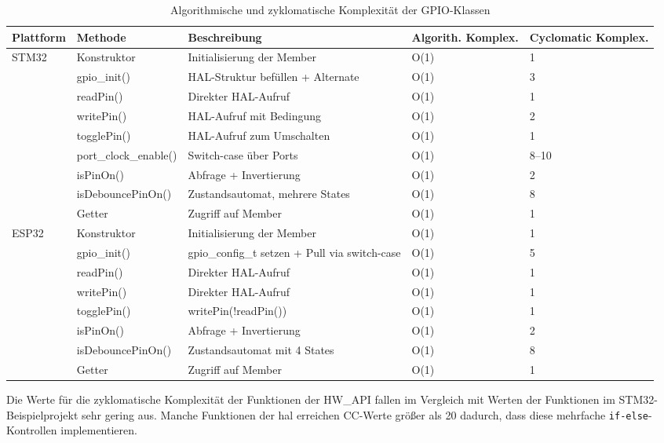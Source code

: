 \begin{table}[H]
\centering
	\begin{tabular}{@{}llp{4cm}p{2cm}p{2cm}@{}}
	\toprule
\textbf{Plattform} & \textbf{Methode} & \textbf{Beschreibung} & \textbf{Algorith. Komplex.} & \textbf{Cyclomatic Komplex.} \\ \midrule
STM32 & Konstruktor & Initialisierung der Member & O(1) & 1 \\
      & gpio\_init() & HAL-Struktur befüllen + Alternate & O(1) & 3 \\
      & readPin() & Direkter HAL-Aufruf & O(1) & 1 \\
      & writePin() & HAL-Aufruf mit Bedingung & O(1) & 2 \\
      & togglePin() & HAL-Aufruf zum Umschalten & O(1) & 1 \\
      & port\_clock\_enable() & Switch-case über Ports & O(1) & 8--10 \\
      & isPinOn() & Abfrage + Invertierung & O(1) & 2 \\
      & isDebouncePinOn() & Zustandsautomat, mehrere States & O(1) & 8 \\
      & Getter & Zugriff auf Member & O(1) & 1 \\ \midrule
ESP32 & Konstruktor & Initialisierung der Member & O(1) & 1 \\
      & gpio\_init() & gpio\_config\_t setzen + Pull via switch-case & O(1) & 5 \\
      & readPin() & Direkter HAL-Aufruf & O(1) & 1 \\
      & writePin() & Direkter HAL-Aufruf & O(1) & 1 \\
      & togglePin() & writePin(!readPin()) & O(1) & 1 \\
      & isPinOn() & Abfrage + Invertierung & O(1) & 2 \\
      & isDebouncePinOn() & Zustandsautomat mit 4 States & O(1) & 8 \\
      & Getter & Zugriff auf Member & O(1) & 1 \\ 
	\bottomrule
	\end{tabular}
	\caption{Algorithmische und zyklomatische Komplexität der GPIO-Klassen}
	\label{tab:gpio_complexity}
\end{table}

Die Werte für die zyklomatische Komplexität der Funktionen der HW\_API fallen im Vergleich mit Werten der Funktionen im STM32-Beispielprojekt sehr gering aus.
Manche Funktionen der \gls{hal} erreichen CC-Werte größer als 20 dadurch, dass diese mehrfache \texttt{if-else}-Kontrollen implementieren. 

